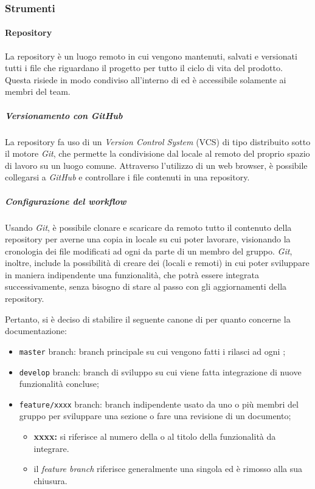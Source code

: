 \subsubsection{Strumenti}


	\paragraph{Repository}
	

	La repository è un luogo remoto in cui vengono mantenuti, salvati e versionati tutti i file che riguardano il progetto per tutto il ciclo di vita del prodotto. Questa risiede in modo condiviso all'interno di  ed è accessibile solamente ai membri del team.

		\subparagraph{Versionamento con GitHub}

		La repository fa uso di un \textit{Version Control System} (VCS) di tipo distribuito sotto il motore \textit{Git}, che permette la condivisione dal locale al remoto del proprio spazio di lavoro su un luogo comune. Attraverso l'utilizzo di un web browser, è possibile collegarsi a \textit{GitHub} e controllare i file contenuti in una repository. 

		\subparagraph{Configurazione del workflow}

		Usando \textit{Git}, è possibile clonare e scaricare da remoto tutto il contenuto della repository per averne una copia in locale su cui poter lavorare, visionando la cronologia dei file modificati ad ogni  da parte di un membro del gruppo.
		\textit{Git}, inoltre, include la possibilità di creare dei  (locali e remoti) in cui poter sviluppare in maniera indipendente una funzionalità, che potrà essere integrata successivamente, senza bisogno di stare al passo con gli aggiornamenti della repository.

		Pertanto, si è deciso di stabilire il seguente canone di  per quanto concerne la documentazione:
		\begin{itemize}
			\item \verb!master! branch: branch principale su cui vengono fatti i rilasci ad ogni ;
			\item \verb!develop! branch: branch di sviluppo su cui viene fatta integrazione di nuove funzionalità concluse;
			\item \verb!feature/xxxx! branch: branch indipendente usato da uno o più membri del gruppo per sviluppare una sezione o fare una revisione di un documento;
			\begin{itemize}
				\item \textbf{xxxx:} si riferisce al numero della  o al titolo della funzionalità da integrare.
				\item il \textit{feature branch} riferisce generalmente una singola  ed è rimosso alla sua chiusura.
			\end{itemize}
		\end{itemize}

